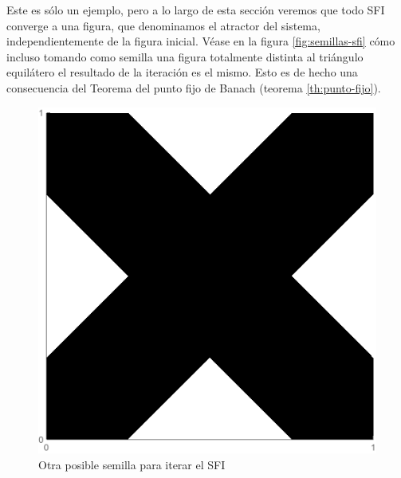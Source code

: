 Este es sólo un ejemplo, pero a lo largo de esta sección veremos que todo SFI converge a una figura, que denominamos el atractor del sistema, independientemente de la figura inicial. Véase en la figura \ref{fig:semillas-sfi} cómo incluso tomando como semilla una figura totalmente distinta al triángulo equilátero el resultado de la iteración es el mismo. Esto es de hecho una consecuencia del Teorema del punto fijo de Banach (teorema \ref{th:punto-fijo}).

\begin{figure} [ht]
    \centering
    \includegraphics[scale = 0.33]{img/C4/figura-X.png}
    \caption{Otra posible semilla para iterar el SFI}
        \label{fig:semilla-X}
\end{figure}

